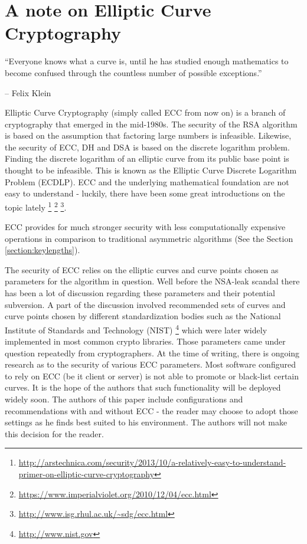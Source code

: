 \section{A note on Elliptic Curve Cryptography}
\label{section:EllipticCurveCryptography}


\epigraph{``Everyone knows what a curve is, until he has studied enough
mathematics to become confused through the countless number of possible
exceptions.''}{-- Felix Klein }

Elliptic Curve Cryptography (simply called ECC from now on) is a branch of
cryptography that emerged in the mid-1980s.  The security of the RSA
algorithm is based on the assumption that factoring large numbers is infeasible.
Likewise, the security of ECC, DH and DSA is based on the discrete logarithm
problem\cite{Wikipedia:Discrete,McC90,WR13}.  Finding the discrete logarithm of
an elliptic curve from its public base point is thought to be infeasible. This
is known as the Elliptic Curve Discrete Logarithm Problem (ECDLP). ECC and the
underlying mathematical foundation are not easy to understand - luckily, there
have been some great introductions on the topic lately
\footnote{\url{http://arstechnica.com/security/2013/10/a-relatively-easy-to-understand-primer-on-elliptic-curve-cryptography}}
\footnote{\url{https://www.imperialviolet.org/2010/12/04/ecc.html}}
\footnote{\url{http://www.isg.rhul.ac.uk/~sdg/ecc.html}}.

ECC provides for much stronger security with less computationally expensive
operations in comparison to traditional asymmetric algorithms (See the Section
\ref{section:keylengths}).


The security of ECC relies on the elliptic curves and curve points chosen as
parameters for the algorithm in question. Well before the NSA-leak scandal
there has been a lot of discussion regarding these parameters and their
potential subversion. A part of the discussion involved recommended sets of
curves and curve points chosen by different standardization bodies such as the
National Institute of Standards and Technology (NIST)
\footnote{\url{http://www.nist.gov}} which were later widely implemented in
most common crypto libraries. Those parameters came under question repeatedly
from cryptographers\cite{BL13,Sch13b,W13}.  At the time of writing, there is
ongoing research as to the security of various ECC parameters\cite{DJBSC}.
Most software configured to rely on ECC (be it client or server) is not able to
promote or black-list certain curves. It is the hope of the authors that such
functionality will be deployed widely soon.  The authors of this paper include
configurations and recommendations with and without ECC - the reader may choose
to adopt those settings as he finds best suited to his environment. The authors
will not make this decision for the reader.


